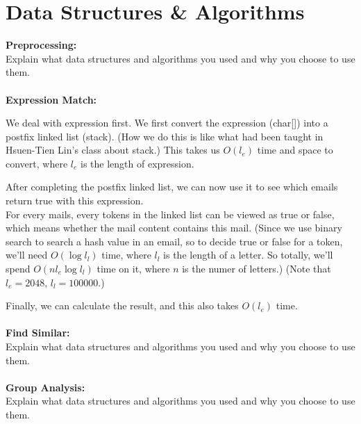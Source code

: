\documentclass{article}
\begin{document}
\section*{Data Structures \& Algorithms}
\textbf{Preprocessing:}\\
Explain what data structures and algorithms you used and why you choose to use them.\\ \\
\textbf{Expression Match:}

We deal with expression first. We first convert the expression (char[]) into a postfix linked list (stack). (How we do this is like what had been taught in Hsuen-Tien Lin's class about stack.)
This takes us $O(l_e)$ time and space to convert, where $l_e$ is the length of expression.

After completing the postfix linked list, we can now use it to see which emails return true with this expression.\\
For every mails, every tokens in the linked list can be viewed as true or false, which means whether the mail content contains this mail.
(Since we use binary search to search a hash value in an email, so to decide true or false for a token, we'll need $O(\log l_l)$ time, where $l_l$ is the length of a letter. So totally, we'll spend $O(n l_e \log l_l)$ time on it, where $n$ is the numer of letters.)
(Note that $l_e = 2048$, $l_l = 100000$.)

Finally, we can calculate the result, and this also takes $O(l_e)$ time.\\ \\
\textbf{Find Similar:}\\
Explain what data structures and algorithms you used and why you choose to use them.\\ \\
\textbf{Group Analysis:}\\
Explain what data structures and algorithms you used and why you choose to use them.\\
\end{document}
